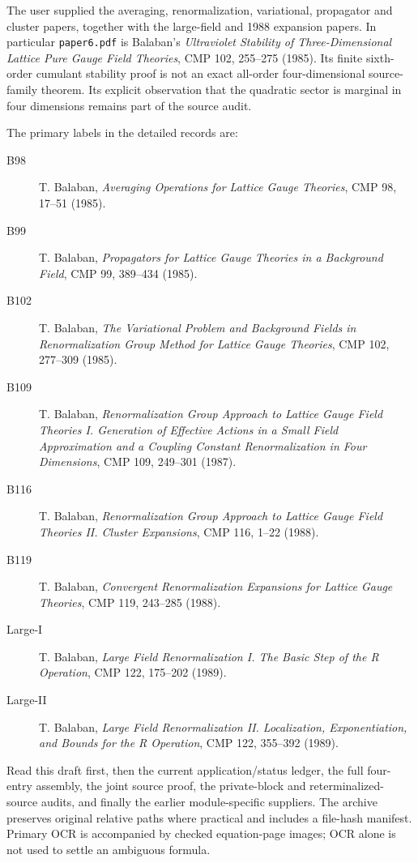 \documentclass[11pt]{article}
\theoremstyle{definition}\newtheorem{definition}[theorem]{Definition}
\theoremstyle{remark}\newtheorem{remark}[theorem]{Remark}
\begin{document}
The user supplied the averaging, renormalization, variational, propagator and cluster papers, together with the large-field and 1988 expansion papers. In particular \texttt{paper6.pdf} is Balaban's \emph{Ultraviolet Stability of Three-Dimensional Lattice Pure Gauge Field Theories}, CMP 102, 255--275 (1985). Its finite sixth-order cumulant stability proof is not an exact all-order four-dimensional source-family theorem. Its explicit observation that the quadratic sector is marginal in four dimensions remains part of the source audit.

The primary labels in the detailed records are:
\begin{description}
\item[B98] T. Balaban, \emph{Averaging Operations for Lattice Gauge Theories}, CMP 98, 17--51 (1985).
\item[B99] T. Balaban, \emph{Propagators for Lattice Gauge Theories in a Background Field}, CMP 99, 389--434 (1985).
\item[B102] T. Balaban, \emph{The Variational Problem and Background Fields in Renormalization Group Method for Lattice Gauge Theories}, CMP 102, 277--309 (1985).
\item[B109] T. Balaban, \emph{Renormalization Group Approach to Lattice Gauge Field Theories I. Generation of Effective Actions in a Small Field Approximation and a Coupling Constant Renormalization in Four Dimensions}, CMP 109, 249--301 (1987).
\item[B116] T. Balaban, \emph{Renormalization Group Approach to Lattice Gauge Field Theories II. Cluster Expansions}, CMP 116, 1--22 (1988).
\item[B119] T. Balaban, \emph{Convergent Renormalization Expansions for Lattice Gauge Theories}, CMP 119, 243--285 (1988).
\item[Large-I] T. Balaban, \emph{Large Field Renormalization I. The Basic Step of the R Operation}, CMP 122, 175--202 (1989).
\item[Large-II] T. Balaban, \emph{Large Field Renormalization II. Localization, Exponentiation, and Bounds for the R Operation}, CMP 122, 355--392 (1989).
\end{description}

Read this draft first, then the current application/status ledger, the full four-entry assembly, the joint source proof, the private-block and reterminalized-source audits, and finally the earlier module-specific suppliers. The archive preserves original relative paths where practical and includes a file-hash manifest. Primary OCR is accompanied by checked equation-page images; OCR alone is not used to settle an ambiguous formula.
\end{document}
